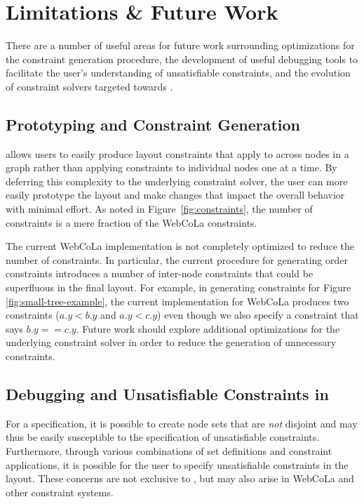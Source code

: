 \section{Limitations \& Future Work}
\constraintsFigure
There are a number of useful areas for future work surrounding optimizations
for the constraint generation procedure, the development of useful debugging
tools to facilitate the user's understanding of unsatisfiable constraints,
and the evolution of constraint solvers targeted towards \projectname.


\subsection{Prototyping and Constraint Generation}
\projectname allows users to easily produce layout constraints that apply
to across nodes in a graph rather than applying constraints to individual
nodes one at a time. By deferring this complexity to the underlying constraint
solver, the user can more easily prototype the layout and make changes that
impact the overall behavior with minimal effort. As noted in Figure~\ref{fig:constraints},
the number of \projectname constraints is a mere fraction of the WebCoLa constraints.

The current WebCoLa implementation is not completely optimized to reduce the
number of constraints. In particular, the current procedure for generating
order constraints introduces a number of inter-node constraints that could
be superfluous in the final layout. For example, in generating constraints
for Figure \ref{fig:small-tree-example}, the current \projectname implementation
for WebCoLa produces two constraints ($a.y < b.y$ and $a.y < c.y$) even though
we also specify a constraint that says $b.y == c.y$. Future work should explore
additional optimizations for the underlying constraint solver in order to
reduce the generation of unnecessary constraints.

\subsection{Debugging and Unsatisfiable Constraints in \projectname}
For a \projectname specification, it is possible to create node sets that
are \emph{not} disjoint and may thus be easily susceptible to the
specification of unsatisfiable constraints. Furthermore, through various
combinations of set definitions and constraint applications, it is
possible for the user to specify unsatisfiable constraints in the
\projectname layout. These concerns are not exclusive to \projectname, but
may also arise in WebCoLa and other constraint systems.

